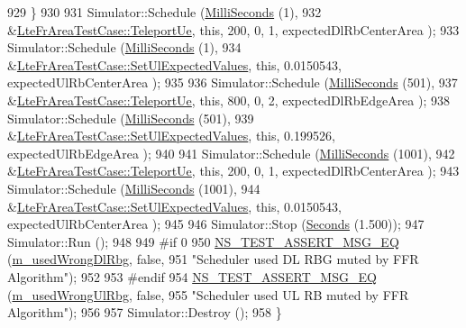 \begin{DoxyCode}
929     \}
930 
931   Simulator::Schedule (\hyperlink{group__timecivil_gaf26127cf4571146b83a92ee18679c7a9}{MilliSeconds} (1),
932                        &\hyperlink{classLteFrAreaTestCase_ad644210c338d4e34da3c5d7f0c511269}{LteFrAreaTestCase::TeleportUe}, \textcolor{keyword}{this}, 200, 0, 1, 
      expectedDlRbCenterArea );
933   Simulator::Schedule (\hyperlink{group__timecivil_gaf26127cf4571146b83a92ee18679c7a9}{MilliSeconds} (1),
934                        &\hyperlink{classLteFrAreaTestCase_aac2718dc3703d2ad389f88ffa20d035e}{LteFrAreaTestCase::SetUlExpectedValues}, \textcolor{keyword}{this},
       0.0150543, expectedUlRbCenterArea );
935 
936   Simulator::Schedule (\hyperlink{group__timecivil_gaf26127cf4571146b83a92ee18679c7a9}{MilliSeconds} (501),
937                        &\hyperlink{classLteFrAreaTestCase_ad644210c338d4e34da3c5d7f0c511269}{LteFrAreaTestCase::TeleportUe}, \textcolor{keyword}{this}, 800, 0, 2, 
      expectedDlRbEdgeArea );
938   Simulator::Schedule (\hyperlink{group__timecivil_gaf26127cf4571146b83a92ee18679c7a9}{MilliSeconds} (501),
939                        &\hyperlink{classLteFrAreaTestCase_aac2718dc3703d2ad389f88ffa20d035e}{LteFrAreaTestCase::SetUlExpectedValues}, \textcolor{keyword}{this},
       0.199526, expectedUlRbEdgeArea );
940 
941   Simulator::Schedule (\hyperlink{group__timecivil_gaf26127cf4571146b83a92ee18679c7a9}{MilliSeconds} (1001),
942                        &\hyperlink{classLteFrAreaTestCase_ad644210c338d4e34da3c5d7f0c511269}{LteFrAreaTestCase::TeleportUe}, \textcolor{keyword}{this}, 200, 0, 1, 
      expectedDlRbCenterArea );
943   Simulator::Schedule (\hyperlink{group__timecivil_gaf26127cf4571146b83a92ee18679c7a9}{MilliSeconds} (1001),
944                        &\hyperlink{classLteFrAreaTestCase_aac2718dc3703d2ad389f88ffa20d035e}{LteFrAreaTestCase::SetUlExpectedValues}, \textcolor{keyword}{this},
       0.0150543, expectedUlRbCenterArea );
945 
946   Simulator::Stop (\hyperlink{group__timecivil_ga33c34b816f8ff6628e33d5c8e9713b9e}{Seconds} (1.500));
947   Simulator::Run ();
948 
949 \textcolor{preprocessor}{#if 0}
950   \hyperlink{group__testing_ga2a9d78cffb3db8e867c35fff0b698cf5}{NS\_TEST\_ASSERT\_MSG\_EQ} (\hyperlink{classLteFrAreaTestCase_acf1b825c0fc50c57ac990d11ea1529c0}{m\_usedWrongDlRbg}, \textcolor{keyword}{false},
951                          \textcolor{stringliteral}{"Scheduler used DL RBG muted by FFR Algorithm"});
952 
953 \textcolor{preprocessor}{#endif}
954   \hyperlink{group__testing_ga2a9d78cffb3db8e867c35fff0b698cf5}{NS\_TEST\_ASSERT\_MSG\_EQ} (\hyperlink{classLteFrAreaTestCase_a11e401119f17b78d6693ef29f82b8895}{m\_usedWrongUlRbg}, \textcolor{keyword}{false},
955                          \textcolor{stringliteral}{"Scheduler used UL RB muted by FFR Algorithm"});
956 
957   Simulator::Destroy ();
958 \}
\end{DoxyCode}


